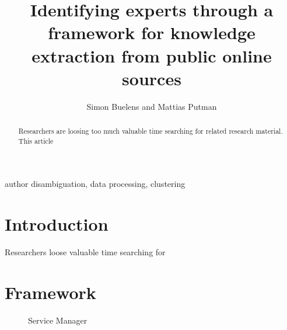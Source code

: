 \documentclass[9pt, twocolumn]{phdsymp} %
\begin{document}
\title{Identifying experts through a framework for knowledge extraction from public online sources} %

\author{Simon Buelens and Mattias Putman}


\maketitle

\begin{abstract} 

Researchers are loosing too much valuable time searching for related research material. This article 

\end{abstract}

\begin{keywords}
author disambiguation, data processing, clustering
\end{keywords}

\section{Introduction}

Researchers loose valuable time searching for 


\section{Framework}

\begin{figure}
\centering
\caption{Service Manager}
\label{fig:architectuur}
\end{figure}
\end{document}
